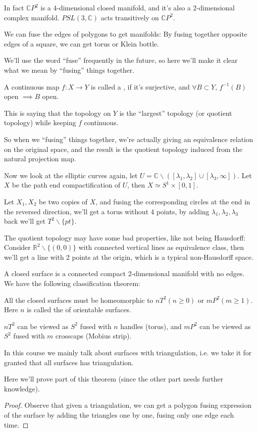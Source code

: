 In fact $\mathbb{C}P^2$ is a 4-dimensional closed manifold,
and it's also a 2-dimensional complex manifold.
$PSL(3, \mathbb{C})$ acts transitively on $\mathbb{C}P^2$.

\begin{example}
    We can fuse the edges of polygons to get manifolds:
	By fusing together opposite edges of a square,
	we can get torus or Klein bottle.
\end{example}

We'll use the word ``fuse'' frequently in the future,
so here we'll make it clear what we mean by ``fusing'' things together.

\begin{definition}
	A continuous map $f: X\to Y$ is called a ,
	if it's surjective, and $\forall B \subset Y$,
	$f^{-1}(B)$ open $\implies B$ open.

	This is saying that the topology on $Y$ is the ``largest''
	topology (or quotient topology) while keeping $f$ continuous.
\end{definition}

So when we ``fusing'' things together, we're actually giving an
equivalence relation on the original space, and the result
is the quotient topology induced from the natural projection map.

Now we look at the elliptic curves again,
let $U = \mathbb{C} \backslash ([\lambda_1,\lambda_2]\cup [\lambda_3, \infty])$.
Let $X$ be the path end compactification of $U$, then $X\simeq S^1\times [0,1]$.

Let $X_1, X_2$ be two copies of $X$, and fusing the corresponding circles
at the end in the reversed direction, we'll get a torus without 4 points,
by adding $\lambda_1, \lambda_2, \lambda_3$ back we'll get $T^2\backslash\{pt\}$.

\begin{remark}
    The quotient topology may have some bad properties, like not being Hausdorff:
	Consider $\mathbb{R}^2\backslash\{(0,0)\}$ with connected vertical lines
	as equivalence class, then we'll get a line with 2 points at the origin,
	which is a typical non-Hausdorff space.
\end{remark}

A closed surface is a connected compact 2-dimensional manifold with no edges.
We have the following classification theorem:
\begin{theorem}
    All the closed surfaces must be homeomorphic to $nT^2 (n\ge 0)$ or $mP^2 (m\ge 1)$.
	Here $n$ is called the  of orientable surfaces.

	$nT^2$ can be viewed as $S^2$ fused with $n$ handles (torus),
	and $mP^2$ can be viewed as $S^2$ fused with $m$ crosscaps (Mobius strip).
\end{theorem}
In this course we mainly talk about surfaces with triangulation, i.e.
we take it for granted that all surfaces has triangulation.

Here we'll prove part of this theorem (since the other part needs further knowledge).
\begin{proof}[Proof]
    Observe that given a triangulation, we can get a polygon fusing expression
	of the surface by adding the triangles one by one, fusing only one edge each time.
\end{proof}
